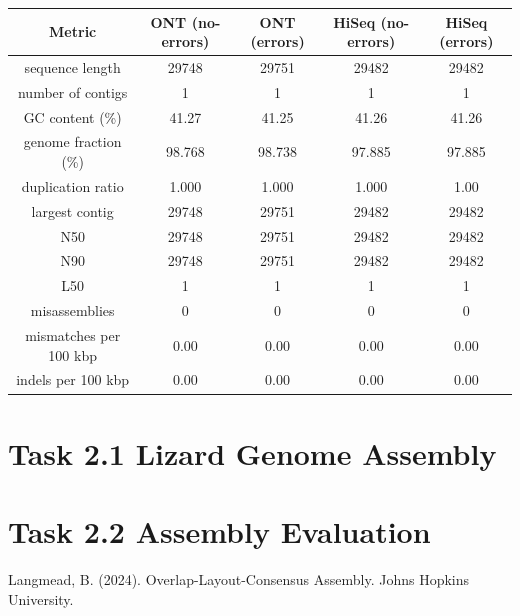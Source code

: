 \documentclass[12pt]{article}
\begin{document}
\begin{center}
\begin{tabular}{ |c|c|c|c|c| }
    \hline
    Metric & ONT (no-errors) & ONT (errors) & HiSeq (no-errors) & HiSeq (errors) \\
    \hline
    sequence length & 29748 & 29751 & 29482 & 29482 \\
    number of contigs & 1 & 1 & 1 & 1 \\
    GC content (\%) & 41.27 & 41.25 & 41.26 & 41.26  \\
    genome fraction (\%) & 98.768 & 98.738 & 97.885  & 97.885 \\
    duplication ratio & 1.000 & 1.000 & 1.000 & 1.00 \\
    largest contig & 29748 & 29751 & 29482 & 29482 \\
    N50 & 29748 & 29751 & 29482 & 29482 \\
    N90 & 29748 & 29751 & 29482 & 29482 \\
    L50 & 1 & 1 & 1 & 1 \\
    misassemblies & 0 & 0 & 0 & 0 \\
    mismatches per 100 kbp & 0.00 & 0.00 & 0.00 & 0.00 \\
    indels per 100 kbp & 0.00 & 0.00 & 0.00 & 0.00 \\
    \hline
\end{tabular}
\end{center}

\section{Task 2.1 Lizard Genome Assembly}

\section{Task 2.2 Assembly Evaluation}

\begin{thebibliography}{9}
Langmead, B. (2024). Overlap-Layout-Consensus Assembly. Johns Hopkins University.
\end{thebibliography}
\end{document}
